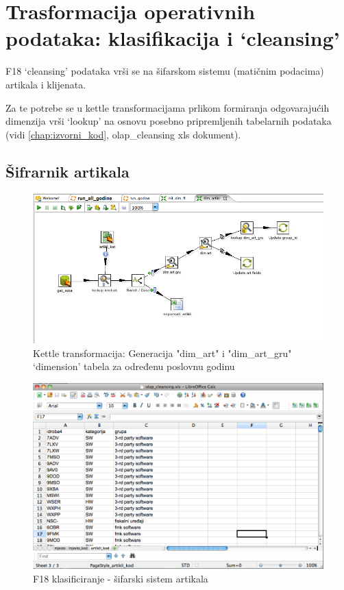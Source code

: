 \documentclass[times, utf8, seminar]{fit}
\begin{document}
\section{Trasformacija operativnih podataka: klasifikacija i `cleansing'}

F18 `cleansing' podataka vrši se na šifarskom sistemu (matičnim podacima) artikala i klijenata.

Za te potrebe se u kettle transformacijama prlikom formiranja odgovarajućih dimenzija vrši `lookup' na osnovu posebno pripremljenih tabelarnih podataka (vidi \ref{chap:izvorni_kod}, olap\_cleansing xls dokument).

\subsection{Šifrarnik artikala}

\begin{figure}[H]
\centering
\includegraphics[width=15cm]{img/kettle_tr_dim_artikli.png}
\caption{Kettle transformacija: Generacija "dim\_art" i "dim\_art\_gru" `dimension' tabela za određenu poslovnu godinu}
\end{figure}

\begin{figure}[H]
\centering
\includegraphics[width=15cm]{img/clean_artikli.png}
\caption{F18 klasificiranje - šifarski sistem artikala}
\end{figure}
\end{document}
